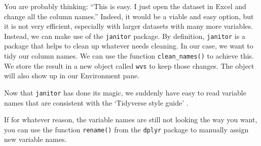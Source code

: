 \documentclass[
]{book}
\newenvironment{Shaded}{\begin{snugshade}}{\end{snugshade}}
\newcommand{\DocumentationTok}[1]{\textcolor[rgb]{0.56,0.35,0.01}{\textbf{\textit{#1}}}}
\newcommand{\FunctionTok}[1]{\textcolor[rgb]{0.00,0.00,0.00}{#1}}
\newcommand{\NormalTok}[1]{#1}
\newcommand{\OtherTok}[1]{\textcolor[rgb]{0.56,0.35,0.01}{#1}}
\newcommand{\SpecialCharTok}[1]{\textcolor[rgb]{0.00,0.00,0.00}{#1}}
\begin{document}
You are probably thinking: ``This is easy. I just open the dataset in Excel and change all the column names.'' Indeed, it would be a viable and easy option, but it is not very efficient, especially with larger datasets with many more variables. Instead, we can make use of the \texttt{janitor} package. By definition, \texttt{janitor} is a package that helps to clean up whatever needs cleaning. In our case, we want to tidy our column names. We can use the function \texttt{clean\_names()} to achieve this. We store the result in a new object called \texttt{wvs} to keep those changes. The object will also show up in our Environment pane.

\begin{Shaded}
\end{Shaded}

Now that \texttt{janitor} has done its magic, we suddenly have easy to read variable names that are consistent with the `Tidyverse style guide' \citep{wickham-2021}.

If for whatever reason, the variable names are still not looking the way you want, you can use the function \texttt{rename()} from the \texttt{dplyr} package to manually assign new variable names.
\end{document}
